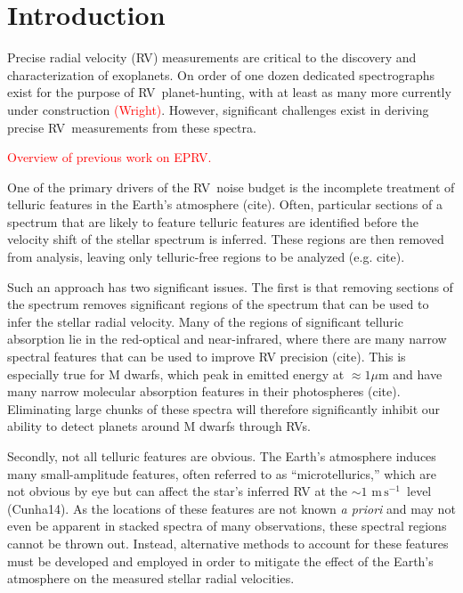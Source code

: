 \documentclass[twocolumn]{aastex62}
\newcommand{\unit}[1]{\mathrm{#1}}
\newcommand{\m}{\unit{m}}
\newcommand{\cm}{\unit{cm}}
\newcommand{\s}{\unit{s}}
\newcommand{\cms}{$\cm\,\s^{-1}$}
\newcommand{\ms}{$\m\,\s^{-1}$}
\newcommand{\todo}[1]{\textcolor{red}{#1}}  %
\newcommand{\acronym}[1]{{\small{#1}}}
\newcommand{\RV}{\acronym{RV}}
\newcommand{\EPRV}{\acronym{EPRV}}
\begin{document}
\section{Introduction}

Precise radial velocity (\RV) measurements are critical to the discovery and characterization of exoplanets. 
On order of one dozen dedicated spectrographs exist for the purpose of \RV\ planet-hunting, with at least as many more currently under construction \todo{(Wright)}. 
However, significant challenges exist in deriving precise \RV\ measurements from these spectra. 

\todo{Overview of previous work on \acronym{EPRV}.}

One of the primary drivers of the \RV\ noise budget is the incomplete treatment of telluric features in the
Earth's atmosphere (cite). 
Often, particular sections of a spectrum that are likely to feature telluric features are identified before the velocity shift of the stellar spectrum is inferred. 
These regions are then removed from analysis, leaving only telluric-free regions to be analyzed (e.g. cite).

Such an approach has two significant issues. 
The first is that removing sections of the spectrum removes significant regions of the spectrum that can be used to infer the stellar radial velocity. 
Many of the regions of significant telluric absorption lie in the red-optical and near-infrared, where there are many narrow spectral features that can be used to improve RV precision (cite).
This is especially true for M dwarfs, which peak in emitted energy at $\approx 1 \mu$m and have many narrow molecular absorption features in their photospheres (cite).
Eliminating large chunks of these spectra will therefore significantly inhibit our ability to detect planets around M dwarfs through RVs.

Secondly, not all telluric features are obvious. 
The Earth's atmosphere induces many small-amplitude features, often referred to as ``microtellurics,'' which are not obvious by eye but can affect the star's inferred RV at the $\sim 1$ \ms\ level (Cunha14). 
As the locations of these features are not known \textit{a priori} and may not even be apparent in stacked spectra of many observations, these spectral regions cannot be thrown out. 
Instead, alternative methods to account for these features must be developed and employed in order to mitigate the effect of the Earth's atmosphere on the measured stellar radial velocities.
\end{document}
